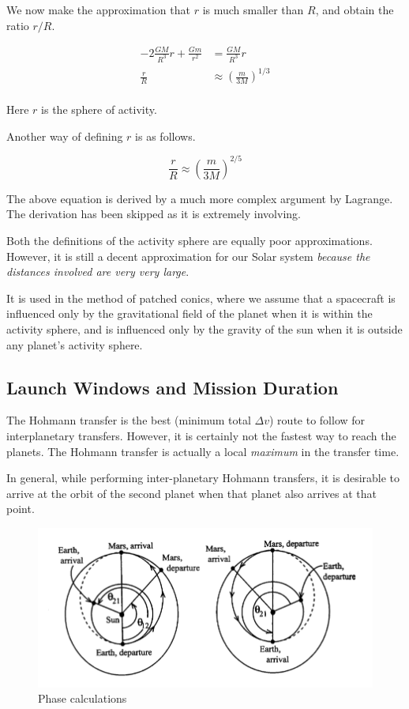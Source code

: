 \documentclass{article}
\theoremstyle{definition}
\begin{document}
We now make the approximation  that $r$ is much smaller than $R$, and obtain the ratio $r/R$.

\begin{equation}
\begin{split}
    - 2 \frac{GM}{R^3}r + \frac{G m}{r^2} & = \frac{GM}{R^3}r\\
     \frac{r}{R} & \approx \left( \frac{m}{3M}\right)^{1/3}\\
\end{split}
\end{equation}

Here $r$ is the sphere of activity.

Another way of defining $r$ is as follows.

\begin{equation}
     \frac{r}{R} \approx \left( \frac{m}{3M}\right)^{2/5}
\end{equation}

The above equation is derived by a much more complex argument by Lagrange. 
The derivation has been skipped as it is extremely involving.

Both the definitions of the activity sphere are equally poor approximations.
However, it is still a decent approximation for our Solar system \emph{because the distances involved are very very large}.

It is used in the method of patched conics, where we assume that a spacecraft is influenced only by the gravitational field of the planet when it is within the activity sphere, and is influenced only by the gravity of the sun when it is outside any planet's activity sphere.

\subsection{Launch Windows and Mission Duration}

The Hohmann transfer is the best (minimum total $\Delta v$) route to follow for interplanetary transfers. 
However, it is certainly not the fastest way to reach the planets.
The Hohmann transfer is actually a local \emph{maximum} in the transfer time.

In general, while performing inter-planetary Hohmann transfers, it is desirable to arrive at the orbit of the second planet when that planet also arrives at that point.

\begin{figure}[h]
    \centering
    \includegraphics[scale=0.4]{image 17.png}
    \caption{Phase calculations}
    \label{fig:interplan}
\end{figure}
\end{document}
